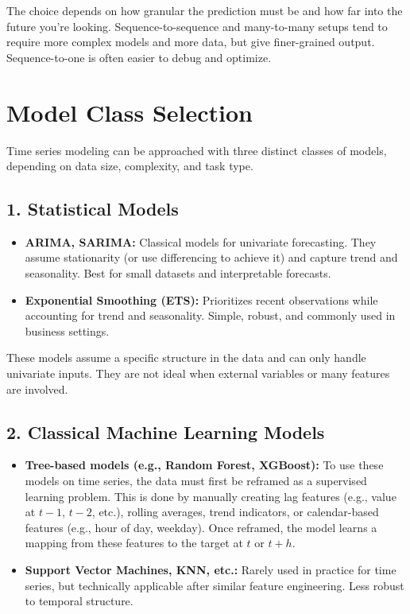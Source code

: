 \documentclass[12pt,openany, draft]{book}
\begin{document}
The choice depends on how granular the prediction must be and how far into the future you're looking. Sequence-to-sequence and many-to-many setups tend to require more complex models and more data, but give finer-grained output. Sequence-to-one is often easier to debug and optimize.


\section{Model Class Selection}

Time series modeling can be approached with three distinct classes of models, depending on data size, complexity, and task type.

\subsection*{1. Statistical Models}

\begin{itemize}
    \item \textbf{ARIMA, SARIMA:} Classical models for univariate forecasting. They assume stationarity (or use differencing to achieve it) and capture trend and seasonality. Best for small datasets and interpretable forecasts.
    
    \item \textbf{Exponential Smoothing (ETS):} Prioritizes recent observations while accounting for trend and seasonality. Simple, robust, and commonly used in business settings.
\end{itemize}

These models assume a specific structure in the data and can only handle univariate inputs. They are not ideal when external variables or many features are involved.

\subsection*{2. Classical Machine Learning Models}

\begin{itemize}
    \item \textbf{Tree-based models (e.g., Random Forest, XGBoost):} To use these models on time series, the data must first be reframed as a supervised learning problem. This is done by manually creating lag features (e.g., value at $t-1$, $t-2$, etc.), rolling averages, trend indicators, or calendar-based features (e.g., hour of day, weekday). Once reframed, the model learns a mapping from these features to the target at $t$ or $t+h$.
    
    \item \textbf{Support Vector Machines, KNN, etc.:} Rarely used in practice for time series, but technically applicable after similar feature engineering. Less robust to temporal structure.
\end{itemize}
\end{document}
